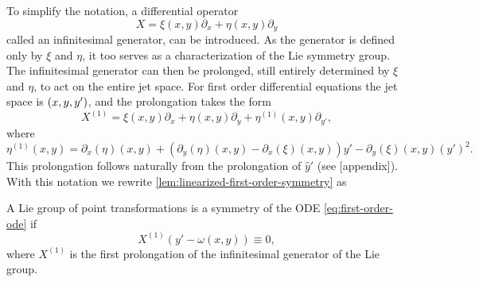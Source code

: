 To simplify the notation, a differential operator
\begin{equation}
  X = \xi(x,y) \partial_x + \eta(x,y) \partial_y
\end{equation}
called an infinitesimal generator, can be introduced.
As the generator is defined only by \(\xi\) and \(\eta\), it too serves as a characterization of the Lie symmetry group.
The infinitesimal generator can then be prolonged, still entirely determined by \(\xi\) and \(\eta\), to act on the entire jet space.
For first order differential equations the jet space is \(\pqty{x, y, y'}\), and the prolongation takes the form
\begin{equation}
  X^{(1)} = \xi(x,y) \partial_x + \eta(x,y) \partial_y + \eta^{(1)}(x,y) \partial_{y'},
\end{equation}
where
\begin{equation}
  \eta^{(1)}(x,y) =
  \partial_x(\eta)(x,y) + (\partial_y(\eta)(x,y) - \partial_x(\xi)(x,y)) y' - \partial_y(\xi)(x,y) \left(y'\right)^2.
\end{equation}
This prolongation follows naturally from the prolongation of \(\hat{y}'\) (see [appendix]). %
With this notation we rewrite \cref{lem:linearized-first-order-symmetry} as
\begin{thm} \label{thm:linearized-first-order-symmetry}
  A Lie group of point transformations is a symmetry of the ODE \ref{eq:first-order-ode} if
  \begin{equation} \label{eq:linearized-first-order-symmetry}
    X^{(1)}\left(y' - \omega(x,y)\right) \equiv 0,
  \end{equation}
  where \(X^{(1)}\) is the first prolongation of the infinitesimal generator of the Lie group.
\end{thm} %

